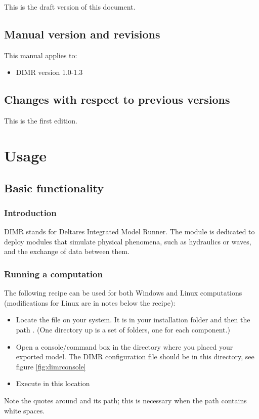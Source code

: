 \documentclass[signature]{deltares_manual}
\newcommand{\dimr}{\textrm{DIMR}\xspace}
\newcommand{\dimrfull}{\textrm{Deltares Integrated Model Runner}\xspace}
\begin{document}
This is the draft version of this document.
\section{Manual version and revisions}
This manual applies to:
\begin{itemize}
	\item \dimr version 1.0-1.3
\end{itemize}

\section{Changes with respect to previous versions}
\label{sec:Changlist}
This is the first edition.

\chapter{Usage}
\label{chap:usage}
\section{Basic functionality}
\label{sec:DIMR_basic_functionality}

\subsection{Introduction} 
\label{subsec:functionalintroduction}
\dimr stands for \dimrfull. The module is dedicated to deploy modules that simulate physical phenomena, such as hydraulics or waves, and the exchange of data between them.

\subsection{Running a computation} 
\label{subsec:DIMRRun}
The following recipe can be used for both Windows and Linux computations (modifications for Linux are in notes below the recipe):
\begin{itemize}
	\item Locate the file  on your system. It is in your installation folder and then the path . (One directory up is a set of folders, one for each component.)
	\item Open a console/command box in the directory where you placed your exported model. The \dimr configuration file should be in this directory, see figure \autoref{fig:dimrconsole}
	\item Execute  in this location
\end{itemize}
\Note Note the quotes around  and its path; this is necessary when the path contains white spaces.
\end{document}
